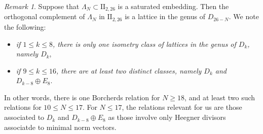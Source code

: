 \documentclass[11pt]{amsart}
\numberwithin{equation}{subsection}
\theoremstyle{plain}
\theoremstyle{remark}
\newtheorem{remark}[theorem]{Remark}
\theoremstyle{definition}
\newcommand{\II}{\textrm{II}}
\begin{document}
\begin{remark}
%
Suppose that  $\Lambda_N\subset \II_{2,26}$ is a saturated embedding.  
Then the orthogonal complement of $\Lambda_N$  in $\II_{2,26}$ is a lattice in the genus of $D_{26-N}$. We note the following:
%
\begin{itemize}
%
\item \emph{if $1\le k\le 8$, there is only one isometry class of lattices in the genus of $D_k$, namely $D_k$},
\item \emph{if $9\le k\le 16$, there are at least two distinct classes, namely $D_{k}$ and $D_{k-8}\oplus E_8$}.
%
\end{itemize}
%
In other words, there is one Borcherds relation for $N\ge 18$, and at least two such relations for $10\le N\le 17$. For $N\le 17$, the relations relevant for us are those associated to $D_{k}$ and $D_{k-8}\oplus E_8$ as those involve only Heegner divisors associatde to minimal norm vectors. 
\end{remark}
%
%
\end{document}
